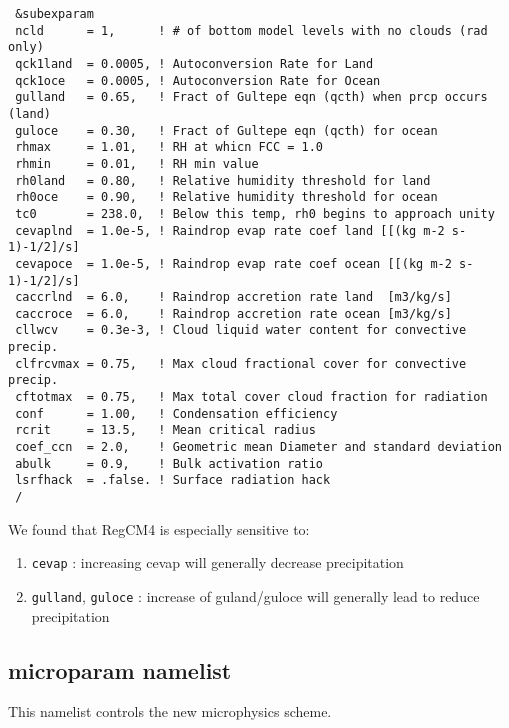 {\footnotesize
\begin{Verbatim}
 &subexparam
 ncld      = 1,      ! # of bottom model levels with no clouds (rad only)
 qck1land  = 0.0005, ! Autoconversion Rate for Land
 qck1oce   = 0.0005, ! Autoconversion Rate for Ocean
 gulland   = 0.65,   ! Fract of Gultepe eqn (qcth) when prcp occurs (land)
 guloce    = 0.30,   ! Fract of Gultepe eqn (qcth) for ocean
 rhmax     = 1.01,   ! RH at whicn FCC = 1.0
 rhmin     = 0.01,   ! RH min value
 rh0land   = 0.80,   ! Relative humidity threshold for land
 rh0oce    = 0.90,   ! Relative humidity threshold for ocean
 tc0       = 238.0,  ! Below this temp, rh0 begins to approach unity
 cevaplnd  = 1.0e-5, ! Raindrop evap rate coef land [[(kg m-2 s-1)-1/2]/s]
 cevapoce  = 1.0e-5, ! Raindrop evap rate coef ocean [[(kg m-2 s-1)-1/2]/s]
 caccrlnd  = 6.0,    ! Raindrop accretion rate land  [m3/kg/s]
 caccroce  = 6.0,    ! Raindrop accretion rate ocean [m3/kg/s]
 cllwcv    = 0.3e-3, ! Cloud liquid water content for convective precip.
 clfrcvmax = 0.75,   ! Max cloud fractional cover for convective precip.
 cftotmax  = 0.75,   ! Max total cover cloud fraction for radiation
 conf      = 1.00,   ! Condensation efficiency
 rcrit     = 13.5,   ! Mean critical radius
 coef_ccn  = 2.0,    ! Geometric mean Diameter and standard deviation
 abulk     = 0.9,    ! Bulk activation ratio
 lsrfhack  = .false. ! Surface radiation hack
 /
\end{Verbatim}
}

We found that RegCM4 is especially sensitive to:

\begin{enumerate}
\item \verb=cevap= : increasing cevap will generally decrease precipitation
\item \verb=gulland=, \verb=guloce= : increase of guland/guloce will generally
lead to reduce precipitation
\end{enumerate}

\subsection{microparam namelist}

This namelist controls the new microphysics scheme.

